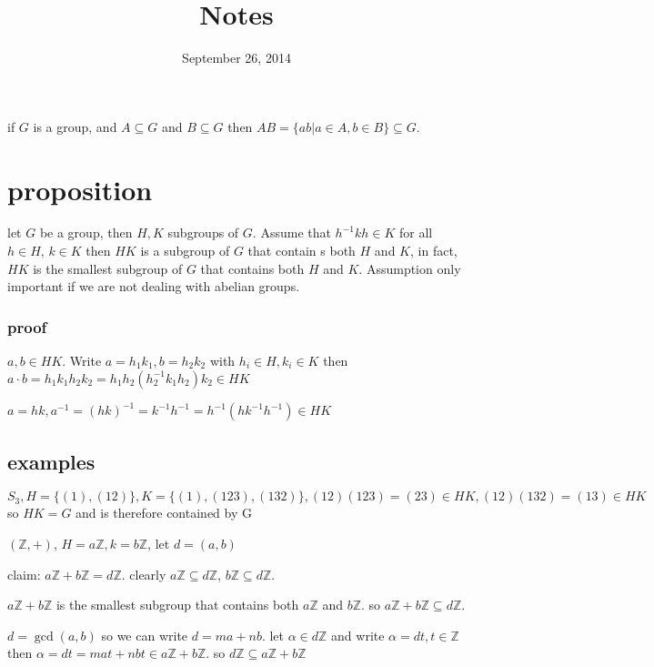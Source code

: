 \documentclass[letterpaper]{article}
\begin{document}
\title{Notes}
\date{September 26, 2014}
\maketitle
if $G$ is a group, and $A\subseteq G$ and $B\subseteq G$ then $AB=\{ab|a\in A, b\in B\}\subseteq G$.

\section*{proposition}

let $G$ be a group, then $H,K$ subgroups of $G$. Assume that $h^{-1}kh\in K$ for all $h\in H$, $k\in K$ then $HK$ is a subgroup of $G$ that contain s both $H$ and $K$, in fact, $HK$ is the smallest subgroup of $G$ that contains both $H$ and $K$. Assumption only important if we are not dealing with abelian groups.

\subsubsection*{proof}
$a,b\in HK$. Write $a=h_1k_1,b=h_2k_2$ with $h_i\in H,k_i\in K$ then $a\cdot b=h_1k_1h_2k_2=h_1h_2(h_2^{-1}k_1h_2)k_2\in HK$

$a=hk, a^{-1}=(hk)^{-1}=k^{-1}h^{-1}=h^{-1}(hk^{-1}h^{-1})\in HK$

\subsection*{examples}
$S_3, H=\{(1),(12)\}, K=\{(1),(123),(132)\}, (12)(123)=(23)\in HK, (12)(132)=(13)\in HK$ so $HK=G$ and is therefore contained by G

$(\mathbb{Z},+)$, $H=a\mathbb{Z}, k=b\mathbb{Z}$, let $d=(a,b)$

claim: $a\mathbb{Z}+b\mathbb{Z}=d\mathbb{Z}$. clearly $a\mathbb{Z}\subseteq d\mathbb{Z}$, $b\mathbb{Z}\subseteq d\mathbb{Z}$. 

$a\mathbb{Z}+b\mathbb{Z}$ is the smallest subgroup that contains both $a\mathbb{Z}$ and $b\mathbb{Z}$. so $a\mathbb{Z}+b\mathbb{Z}\subseteq d\mathbb{Z}$.

$d=\gcd(a,b)$ so we can write $d=ma+nb$. let $\alpha\in d\mathbb{Z}$ and write $\alpha=dt, t\in \mathbb{Z}$ then $\alpha=dt=mat+nbt\in a\mathbb{Z}+b\mathbb{Z}$. so $d\mathbb{Z}\subseteq a\mathbb{Z}+b\mathbb{Z}$ 
\end{document}
